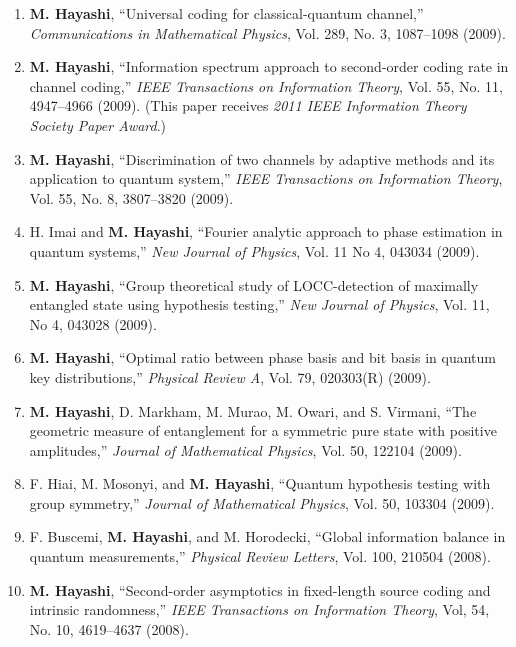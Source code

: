 \documentclass[a4paper,12pt,oneside]{article}
\begin{document}
\begin{enumerate}
\item   \textbf{M. Hayashi}, 
``Universal coding for classical-quantum channel,'' 
{\em Communications in Mathematical Physics}, Vol. 289, No. 3, 1087--1098 (2009). 

\item   \textbf{M. Hayashi}, 
``Information spectrum approach to second-order coding rate in channel coding,'' 
{\em IEEE Transactions on Information Theory},
Vol. 55, No. 11, 4947--4966 (2009). 
(This paper receives {\em 2011 IEEE Information Theory Society Paper Award}.)

\item   \textbf{M. Hayashi}, 
``Discrimination of two channels by adaptive methods and its application to quantum system,'' 
{\em IEEE Transactions on Information Theory}, 
Vol. 55, No. 8, 3807--3820 (2009).

\item   H. Imai and \textbf{M. Hayashi}, 
``Fourier analytic approach to phase estimation in quantum systems,'' 
{\em New Journal of Physics}, Vol. 11 No 4, 043034 (2009). 

\item   \textbf{M. Hayashi}, 
``Group theoretical study of LOCC-detection of maximally entangled state using hypothesis testing,'' 
{\em New Journal of Physics}, Vol. 11, No 4, 043028 (2009).

\item   \textbf{M. Hayashi}, 
``Optimal ratio between phase basis and bit basis in quantum key distributions,'' 
{\em Physical Review A}, Vol. 79, 020303(R) (2009).

\item   \textbf{M. Hayashi}, D. Markham, M. Murao, M. Owari, and S. Virmani, 
``The geometric measure of entanglement for a symmetric pure state with positive amplitudes,'' 
{\em Journal of Mathematical Physics}, Vol. 50, 122104 (2009). 

\item   F. Hiai, M. Mosonyi, and \textbf{M. Hayashi}, 
``Quantum hypothesis testing with group symmetry,''
{\em Journal of Mathematical Physics}, Vol. 50, 103304 (2009).

\item   F. Buscemi, \textbf{M. Hayashi}, and M. Horodecki, 
``Global information balance in quantum measurements,'' 
{\em Physical Review Letters}, Vol. 100, 210504 (2008).

\item   \textbf{M. Hayashi}, 
``Second-order asymptotics in fixed-length source coding and intrinsic randomness,'' 
{\em IEEE Transactions on Information Theory}, Vol, 54, No. 10, 4619--4637 (2008). 


\end{enumerate}
\end{document}
